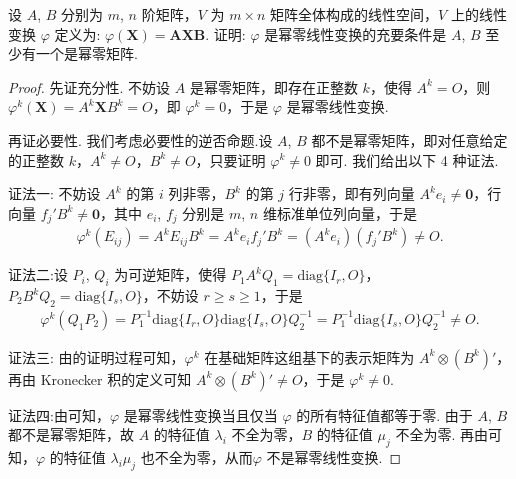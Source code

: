 \documentclass[../../main.tex]{subfiles}
\begin{document}
\begin{example}
设 $A$, $B$ 分别为 $m$, $n$ 阶矩阵，$V$ 为 $m\times n$ 矩阵全体构成的线性空间，$V$ 上的线性变换 $\varphi$ 定义为: $\varphi(\boldsymbol{X}) = \boldsymbol{A}\boldsymbol{X}\boldsymbol{B}$. 证明: $\varphi$ 是幂零线性变换的充要条件是 $A$, $B$ 至少有一个是幂零矩阵.
\end{example}
\begin{proof}
先证充分性. 不妨设 $A$ 是幂零矩阵，即存在正整数 $k$，使得 $A^k = O$，则 $\varphi^k(\boldsymbol{X}) = A^k\boldsymbol{X}B^k = O$，即 $\varphi^k = 0$，于是 $\varphi$ 是幂零线性变换.

再证必要性. 我们考虑必要性的逆否命题.设 $A$, $B$ 都不是幂零矩阵，即对任意给定的正整数 $k$，$A^k\neq O$，$B^k\neq O$，只要证明 $\varphi^k\neq 0$ 即可. 我们给出以下 4 种证法.

{\color{blue}证法一:}
不妨设 $A^k$ 的第 $i$ 列非零，$B^k$ 的第 $j$ 行非零，即有列向量 $A^ke_i\neq \boldsymbol{0}$，行向量 $f_j'B^k\neq \boldsymbol{0}$，其中 $e_i$, $f_j$ 分别是 $m$, $n$ 维标准单位列向量，于是
\begin{align*}
\varphi^k(E_{ij}) = A^kE_{ij}B^k = A^ke_if_j'B^k = (A^ke_i)(f_j'B^k)\neq O.
\end{align*}

{\color{blue}证法二:}设 $P_i$, $Q_i$ 为可逆矩阵，使得 $P_1A^kQ_1 = \mathrm{diag}\{I_r, O\}$，$P_2B^kQ_2 = \mathrm{diag}\{I_s, O\}$，不妨设 $r\geq s\geq 1$，于是
\begin{align*}
\varphi^k(Q_1P_2) = P_1^{-1}\mathrm{diag}\{I_r, O\}\mathrm{diag}\{I_s, O\}Q_2^{-1} = P_1^{-1}\mathrm{diag}\{I_s, O\}Q_2^{-1}\neq O.
\end{align*}

{\color{blue}证法三:} 由的证明过程可知，$\varphi^k$ 在基础矩阵这组基下的表示矩阵为 $A^k\otimes (B^k)'$，再由 Kronecker 积的定义可知 $A^k\otimes (B^k)'\neq O$，于是 $\varphi^k\neq 0$.

{\color{blue}证法四:}由可知，$\varphi$ 是幂零线性变换当且仅当 $\varphi$ 的所有特征值都等于零. 由于 $A$, $B$ 都不是幂零矩阵，故 $A$ 的特征值 $\lambda_i$ 不全为零，$B$ 的特征值 $\mu_j$ 不全为零. 再由可知，$\varphi$ 的特征值 $\lambda_i\mu_j$ 也不全为零，从而$\varphi$ 不是幂零线性变换.
\end{proof}
\end{document}

